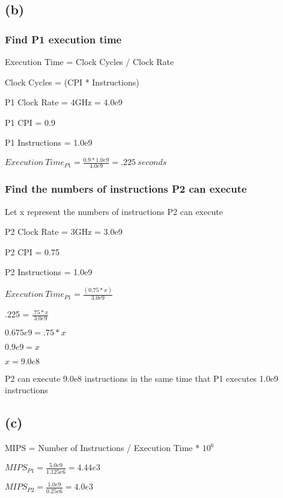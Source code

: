 \documentclass{article}
\begin{document}
    \subsection*{(b)}

    \subsubsection*{Find P1 execution time}

    Execution Time = Clock Cycles / Clock Rate

    Clock Cycles = (CPI * Instructions)

    P1 Clock Rate = 4GHz = 4.0e9
    
    P1 CPI = 0.9

    P1 Instructions = 1.0e9

    \vspace*{6pt}

    $Execution\ Time_{P1} = \frac{0.9 * 1.0e9}{4.0e9} = .225\ seconds$

    \subsubsection*{Find the numbers of instructions P2 can execute}

    Let x represent the numbers of instructions P2 can execute

    P2 Clock Rate = 3GHz = 3.0e9
    
    P2 CPI = 0.75

    P2 Instructions = 1.0e9
    \vspace*{6pt}

    $Execution\ Time_{P1} = \frac{(0.75 * x)}{3.0e9}$

    .225 = $\frac{.75*x}{3.0e9}$

    $0.675e9 = .75 * x$

    $0.9e9 = x$

    $x = 9.0e8$

    P2 can execute 9.0e8 instructions in the same time that P1 executes 1.0e9 instructions

    \subsection*{(c)}

    MIPS = Number of Instructions / Execution Time * $10^6$

    $MIPS_{P1} = \frac{5.0e9}{1.125e6} = 4.44e3$

    $MIPS_{P2} = \frac{1.0e9}{0.25e6} = 4.0e3$
\end{document}

